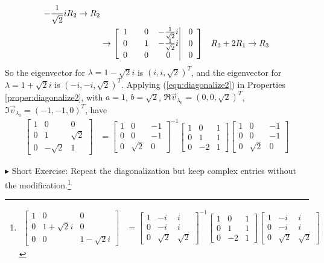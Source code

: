 \begin{solution}
\begin{align*}
\begin{aligned}
-\frac{1}{\sqrt{2}}i R_2 &\to R_2 \\
\end{aligned} \\
&\to  
\left[\begin{array}{@{}wc{15pt}wc{15pt}wc{17pt}|wc{15pt}@{}}
1 & 0 & -\frac{1}{\sqrt{2}}i & 0 \\
0 & 1 & -\frac{1}{\sqrt{2}}i & 0 \\
0 & 0 & 0 & 0
\end{array}\right] & R_3 + 2R_1 \to R_3 
\end{align*}
So the eigenvector for $\lambda = 1 - \sqrt{2}i$ is $(i, i, \sqrt{2})^T$, and the eigenvector for $\lambda = 1 + \sqrt{2}i$ is $(-i, -i, \sqrt{2})^T$. Applying (\ref{eqn:diagonalize2}) in Properties \ref{proper:diagonalize2}, with $a = 1$, $b = \sqrt{2}$, $\Re{\vec{v}_{\lambda_0}} = (0,0,\sqrt{2})^T$, $\Im{\vec{v}_{\lambda_0}} = (-1,-1,0)^T$, have
\begin{align*}
\begin{bmatrix}
1 & 0 & 0 \\
0 & 1 & \sqrt{2} \\
0 & -\sqrt{2} & 1
\end{bmatrix}
&= 
\begin{bmatrix}
1 & 0 & -1 \\
0 & 0 & -1 \\
0 & \sqrt{2} & 0 
\end{bmatrix}^{-1}
\begin{bmatrix}
1 & 0 & 1 \\
0 & 1 & 1 \\
0 & -2 & 1
\end{bmatrix}
\begin{bmatrix}
1 & 0 & -1 \\
0 & 0 & -1 \\
0 & \sqrt{2} & 0 
\end{bmatrix}
\end{align*}
\end{solution}
$\blacktriangleright$ Short Exercise: Repeat the diagonalization but keep complex entries without the modification.\footnote{
\begin{align*}
\begin{bmatrix}
1 & 0 & 0 \\
0 & 1+\sqrt{2}i & 0 \\
0 & 0 & 1-\sqrt{2}i
\end{bmatrix}
&= 
\begin{bmatrix}
1 & -i & i \\
0 & -i & i \\
0 & \sqrt{2} & \sqrt{2} 
\end{bmatrix}^{-1}
\begin{bmatrix}
1 & 0 & 1 \\
0 & 1 & 1 \\
0 & -2 & 1
\end{bmatrix}
\begin{bmatrix}
1 & -i & i \\
0 & -i & i \\
0 & \sqrt{2} & \sqrt{2} 
\end{bmatrix}   
\end{align*}}

